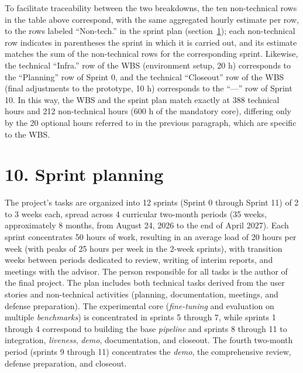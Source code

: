 \documentclass[
  11pt, %
]{charter}
\begin{document}
To facilitate traceability between the two breakdowns, the ten non-technical rows in the table above correspond, with the same aggregated hourly estimate per row, to the rows labeled ``Non-tech.'' in the sprint plan (section~\ref{sec:sprints}); each non-technical row indicates in parentheses the sprint in which it is carried out, and its estimate matches the sum of the non-technical rows for the corresponding sprint. Likewise, the technical ``Infra.'' row of the WBS (environment setup, 20 h) corresponds to the ``Planning'' row of Sprint 0, and the technical ``Closeout'' row of the WBS (final adjustments to the prototype, 10 h) corresponds to the ``---'' row of Sprint 10. In this way, the WBS and the sprint plan match exactly at 388 technical hours and 212 non-technical hours (600 h of the mandatory core), differing only by the 20 optional hours referred to in the previous paragraph, which are specific to the WBS.

\section{10. Sprint planning}
\label{sec:sprints}

The project's tasks are organized into 12 sprints (Sprint 0 through Sprint 11) of 2 to 3 weeks each, spread across 4 curricular two-month periods (35 weeks, approximately 8 months, from August 24, 2026 to the end of April 2027). Each sprint concentrates 50 hours of work, resulting in an average load of 20 hours per week (with peaks of 25 hours per week in the 2-week sprints), with transition weeks between periods dedicated to review, writing of interim reports, and meetings with the advisor. The person responsible for all tasks is the author of the final project. The plan includes both technical tasks derived from the user stories and non-technical activities (planning, documentation, meetings, and defense preparation). The experimental core (\textit{fine-tuning} and evaluation on multiple \textit{benchmarks}) is concentrated in sprints 5 through 7, while sprints 1 through 4 correspond to building the base \textit{pipeline} and sprints 8 through 11 to integration, \textit{liveness}, \textit{demo}, documentation, and closeout. The fourth two-month period (sprints 9 through 11) concentrates the \textit{demo}, the comprehensive review, defense preparation, and closeout.
\end{document}
